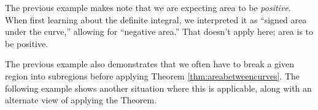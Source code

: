 The previous example makes note that we are expecting area to be \textit{positive}. When first learning about the definite integral, we interpreted it as ``signed area under the curve,'' allowing for ``negative area.'' That doesn't apply here; area is to be positive.

The previous example also demonstrates that we often have to break a given region into subregions before applying Theorem \ref{thm:areabetweencurves}. The following example shows another situation where this is applicable, along with an alternate view of applying the Theorem.\\

